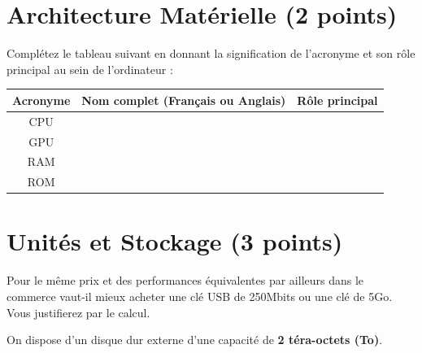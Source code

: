 \documentclass[a4paper, noanswers, addpoints, 12pt]{exam}
\begin{document}
\begin{questions}

\section{Architecture Matérielle (2 points)}

\question[2] Complétez le tableau suivant en donnant la signification de l'acronyme et son rôle principal au sein de l'ordinateur :

\begin{center}
\renewcommand{\arraystretch}{2}
\begin{tabular}{|c|p{5cm}|p{7cm}|}
\hline
\textbf{Acronyme} & \textbf{Nom complet (Français ou Anglais)} & \textbf{Rôle principal} \\ \hline
CPU & & \\ \hline
GPU & & \\ \hline
RAM & & \\ \hline
ROM & & \\ \hline
\end{tabular}
\end{center}


\section{Unités et Stockage (3 points)}

\question[1] Pour le même prix et des performances équivalentes par ailleurs dans le commerce vaut-il mieux acheter une clé USB de 250Mbits ou une clé de 5Go. Vous justifierez par le calcul.

\question[2] On dispose d'un disque dur externe d'une capacité de \textbf{2 téra-octets (To)}.



\end{questions}
\end{document}
